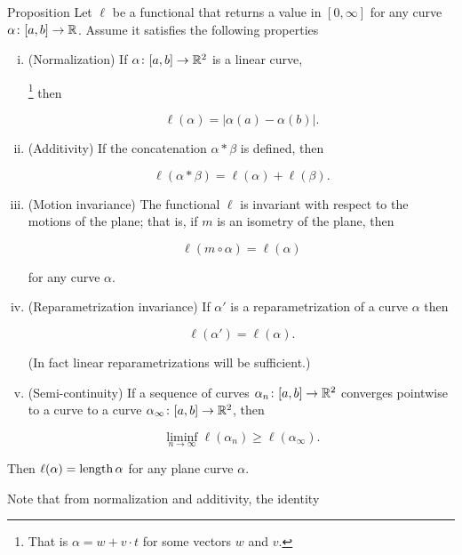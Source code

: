\begin{thm}{Proposition}\label{prop:length-axioms}
Let $\ell$ be a functional that returns a value in $[0,\infty]$ for any curve $\alpha\colon[a,b]\to\mathbb{R}$.
Assume it satisfies the following properties

\begin{enumerate}[(i)]

\item\label{Normalization} (Normalization) If $\alpha\colon[a,b]\to \mathbb{R}^2$ is a linear curve,%

\footnote{That is $\alpha=w+v\cdot t$ for some vectors $w$ and $v$.} then

\[\ell(\alpha)=|\alpha(a)-\alpha(b)|.\]

\item\label{Additivity} (Additivity) If the concatenation $\alpha*\beta$ is defined, then

\[\ell(\alpha*\beta)=\ell(\alpha)+\ell(\beta).\]

\item\label{Motion invariance} (Motion invariance) The functional $\ell$ is invariant with respect to the motions of the plane; that is, if $m$ is an isometry of the plane, then 

\[\ell(m\circ\alpha)=\ell(\alpha)\]

for any curve $\alpha$.

\item\label{Reparametrization invariance} (Reparametrization invariance) If $\alpha'$ is a reparametrization of a curve $\alpha$ then

\[\ell(\alpha')=\ell(\alpha).\]

(In fact linear reparametrizations will be sufficient.)

\item\label{Semi-continuity} (Semi-continuity) If a sequence of curves $\alpha_n\colon[a,b]\to \mathbb{R}^2$ converges pointwise to a curve to a curve $\alpha_\infty\colon[a,b]\to \mathbb{R}^2$, then 

\[\liminf_{n\to\infty} \ell(\alpha_n) \ge \ell(\alpha_\infty).\]

\end{enumerate}

Then $\ell(\alpha)=\mathop{\rm length}\nolimits \alpha$ for any plane curve $\alpha$.



\end{thm}



Note that from normalization and additivity, the identity 

